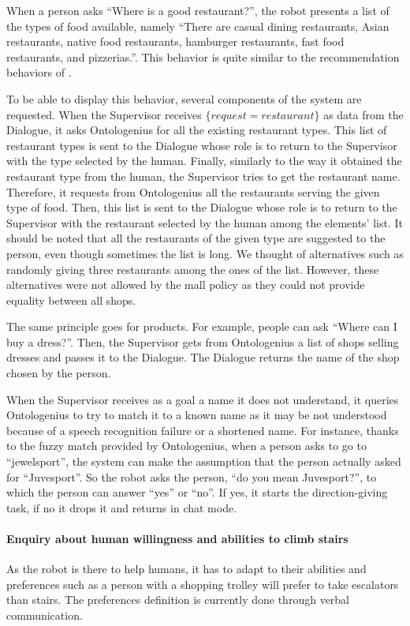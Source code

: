 \documentclass[a4paper,11pt,twoside]{StyleThese}
\begin{document}
When a person asks ``Where is a good restaurant?'', the robot presents a list of the types of food available, namely ``There are casual dining restaurants, Asian restaurants, native food restaurants, hamburger restaurants, fast food restaurants, and pizzerias.''. This behavior is quite similar to the recommendation behaviors of \cite{kanda_2009_affective}.

To be able to display this behavior, several components of the system are requested. When the Supervisor receives $\{request=restaurant\}$ as data from the Dialogue, it asks Ontologenius for all the existing restaurant types. This list of restaurant types is sent to the Dialogue whose role is to return to the Supervisor with the type selected by the human. Finally, similarly to the way it obtained the restaurant type from the human, the Supervisor tries to get the restaurant name. Therefore, it requests from Ontologenius all the restaurants serving the given type of food. Then, this list is sent to the Dialogue whose role is to return to the Supervisor with the restaurant selected by the human among the elements' list. It should be noted that all the restaurants of the given type are suggested to the person, even though sometimes the list is long. We thought of alternatives such as randomly giving three restaurants among the ones of the list. However, these alternatives were not allowed by the mall policy as they could not provide equality between all shops. 

The same principle goes for products. For example, people can ask ``Where can I buy a dress?''. Then, the Supervisor gets from Ontologenius a list of shops selling dresses and passes it to the Dialogue. The Dialogue returns the name of the shop chosen by the person.

When the Supervisor receives as a goal a name it does not understand, it queries Ontologenius to try to match it to a known name as it may be not understood because of a speech recognition failure or a shortened name. For instance, thanks to the fuzzy match provided by Ontologenius, when a person asks to go to ``jewelsport'', the system can make the assumption that the person actually asked for ``Juvesport''. So the robot asks the person, ``do you mean Juvesport?'', to which the person can answer ``yes'' or ``no''. If yes, it starts the direction-giving task, if no it drops it and returns in chat mode.

\paragraph{Enquiry about human willingness and abilities to climb stairs}
As the robot is there to help humans, it has to adapt to their abilities and preferences such as a person with a shopping trolley will prefer to take escalators than stairs. The preferences definition is currently done through verbal communication.
\end{document}
